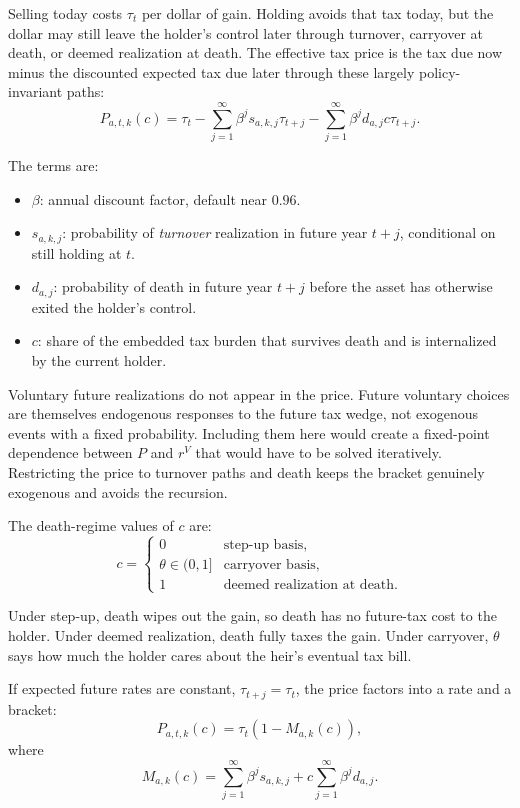 \documentclass[11pt]{article}
\begin{document}
Selling today costs $\tau_t$ per dollar of gain. Holding avoids that tax
today, but the dollar may still leave the holder's control later through
turnover, carryover at death, or deemed realization at death. The effective
tax price is the tax due now minus the discounted expected tax due later
through these largely policy-invariant paths:
\[
\boxed{
P_{a,t,k}(c)
=
\tau_t
-
\sum_{j=1}^{\infty} \beta^j s_{a,k,j}\tau_{t+j}
-
\sum_{j=1}^{\infty} \beta^j d_{a,j}c\tau_{t+j}.
}
\]

The terms are:

\begin{itemize}
  \item $\beta$: annual discount factor, default near $0.96$.
  \item $s_{a,k,j}$: probability of \emph{turnover} realization in future
        year $t+j$, conditional on still holding at $t$.
  \item $d_{a,j}$: probability of death in future year $t+j$ before the
        asset has otherwise exited the holder's control.
  \item $c$: share of the embedded tax burden that survives death and is
        internalized by the current holder.
\end{itemize}

Voluntary future realizations do not appear in the price. Future voluntary
choices are themselves endogenous responses to the future tax wedge, not
exogenous events with a fixed probability. Including them here would create
a fixed-point dependence between $P$ and $r^V$ that would have to be solved
iteratively. Restricting the price to turnover paths and death keeps the
bracket genuinely exogenous and avoids the recursion.

The death-regime values of $c$ are:
\[
c =
\begin{cases}
0 & \text{step-up basis},\\
\theta \in (0,1] & \text{carryover basis},\\
1 & \text{deemed realization at death}.
\end{cases}
\]

Under step-up, death wipes out the gain, so death has no future-tax cost to
the holder. Under deemed realization, death fully taxes the gain. Under
carryover, $\theta$ says how much the holder cares about the heir's eventual
tax bill.

If expected future rates are constant, $\tau_{t+j}=\tau_t$, the price factors
into a rate and a bracket:
\[
P_{a,t,k}(c) = \tau_t\left(1-M_{a,k}(c)\right),
\]
where
\[
M_{a,k}(c)
=
\sum_{j=1}^{\infty}\beta^j s_{a,k,j}
+
c\sum_{j=1}^{\infty}\beta^j d_{a,j}.
\]
\end{document}
